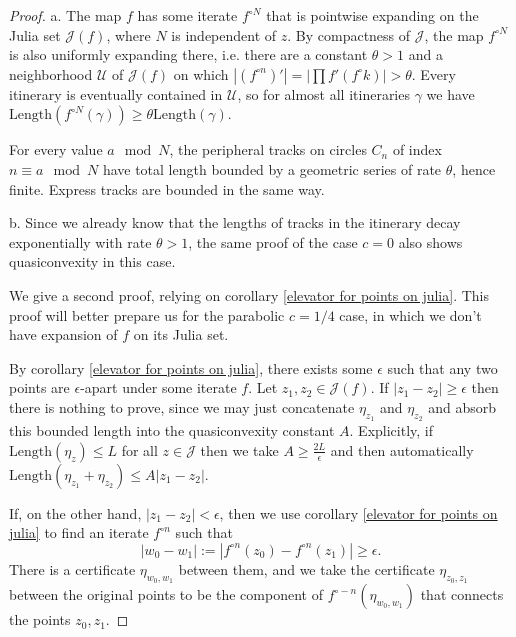 \begin{proof}
a. The map $f$ has some iterate $f^{\circ N}$ that is pointwise expanding on the Julia set $\mathcal{J}(f)$, where $N$ is independent of $z$.
By compactness of $\mathcal J$, the map $f^{\circ N}$ is also uniformly expanding there, i.e. there are a constant $\theta>1$ and a neighborhood $\mathcal{U}$ of $\mathcal{J}(f)$ on which $\left|(f^{\circ n})'\right|=|\prod f'(f^\circ k) |>\theta$. 
Every itinerary is eventually contained in $\mathcal{U}$, so for almost all itineraries $\gamma$ we have $\mathrm{Length} \left( f^{\circ N}(\gamma) \right) \geq \theta \mathrm{Length} \left( \gamma \right)$. 

For every value $a \mod N$, the peripheral tracks on circles $C_n$ of index $n \equiv a \mod N$ have total length bounded by a geometric series of rate $\theta$, hence finite. Express tracks are bounded in the same way. %

b.
 Since we already know that the lengths of tracks in the itinerary decay exponentially with rate $\theta>1$, the same proof of the case $c=0$ also shows quasiconvexity in this case.

We give a second proof, relying on corollary \ref{elevator for points on julia}. This proof will better prepare us for the
parabolic $c=1/4$ case, in which we don't have expansion of $f$ on its Julia set.

By corollary \ref{elevator for points on julia}, there exists some $\epsilon$ such that any two points are $\epsilon$-apart under some iterate $f$. 
Let $z_{1},z_{2}\in\mathcal{J}(f)$. If $\left|z_{1}-z_{2}\right|\geq\epsilon$ then there is nothing to
prove, since we may just concatenate $\eta_{z_{1}}$ and $\eta_{z_{2}}$
and absorb this bounded length into the quasiconvexity constant
$A$. Explicitly, if $\mathrm{Length}\left(\eta_{z}\right)\leq L$
for all $z\in\mathcal{J}$ then we take $A\geq\frac{2L}{\epsilon}$
and then automatically $\mathrm{Length}\left(\eta_{z_{1}}+\eta_{z_{2}}\right)\leq A\left|z_{1}-z_{2}\right|$.

If, on the other hand, $\left|z_{1}-z_{2}\right|<\epsilon$, then
we use  corollary \ref{elevator for points on julia} to find an iterate $f^{\circ n}$ such that 
\begin{equation}
	|w_0-w_1|:=\left|f^{\circ n}(z_{0})-f^{\circ n}(z_{1})\right|\geq\epsilon.
\end{equation}
There is a certificate $\eta_{w_0,w_1}$
between them, and we take the certificate $\eta_{z_{0},z_{1}}$ between
the original points to be the component of $f^{\circ-n}\left(\eta_{w_0,w_1}\right)$
that connects the points $z_{0},z_{1}$.


\end{proof}
